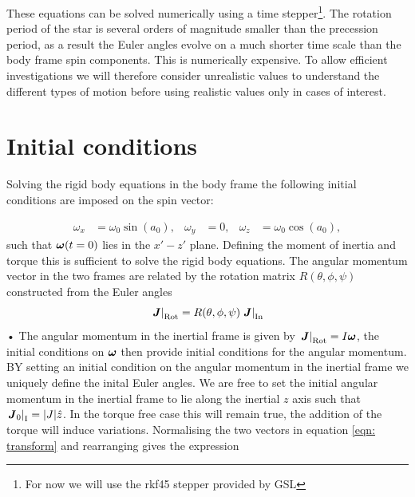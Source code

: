 \documentclass[11pt]{article}
\numberwithin{equation}{section}
\numberwithin{figure}{section}
\numberwithin{table}{section}
\begin{document}
These equations can be solved numerically using a time stepper\footnote{For now
we will use the rkf45 stepper provided by GSL}. %
The rotation period of the star is several orders of magnitude smaller than the
precession period, as a result the Euler angles evolve on a much shorter time
scale than the body frame spin components. This is numerically expensive. To
allow efficient investigations we will therefore consider unrealistic values to
understand the different types of motion before using realistic values only in
cases of interest.


\section{Initial conditions}

Solving the rigid body equations in the body frame the following initial
conditions are imposed on the spin vector:

\begin{align}\label{eqn:spin init}
\omega_{x} & = \omega_{0}\sin(a_{0}), & 
\omega_{y} & = 0, & 
\omega_{z} & = \omega_{0}\cos(a_{0}),
\end{align}
such that  $\boldsymbol{\omega}(t=0)$ lies in the $x' - z'$ plane. Defining the moment of
inertia and torque this is sufficient to solve the rigid body equations. The 
angular momentum vector in the two frames are related by the rotation matrix 
$R(\theta, \phi, \psi)$ constructed from the Euler angles
\begin{equation}
\left. \boldsymbol{J} \right|_{\textrm{Rot}} = R(\theta, \phi, \psi) \left. \boldsymbol{J} \right|_{\textrm{In} }
\label{eqn: transform}
\end{equation}•
The angular momentum in the inertial frame is given by $\left. \boldsymbol{J}
\right|_{\textrm{Rot}}= I \boldsymbol{\omega}$, the initial conditions on $\boldsymbol{\omega}$ then
provide initial conditions for the angular momentum.  BY setting an initial
condition on the angular momentum in the inertial frame we uniquely define the
inital Euler angles. We are free to set the initial angular momentum in the
inertial frame to lie along the inertial $z$ axis such that
$\left.\boldsymbol{J}_{0}\right|_{\textrm{I}} = |J|\hat{z}$. In the torque free case this
will remain true, the addition of the torque will induce variations.
Normalising the two vectors in equation \eqref{eqn: transform} and rearranging
gives the expression
\end{document}
